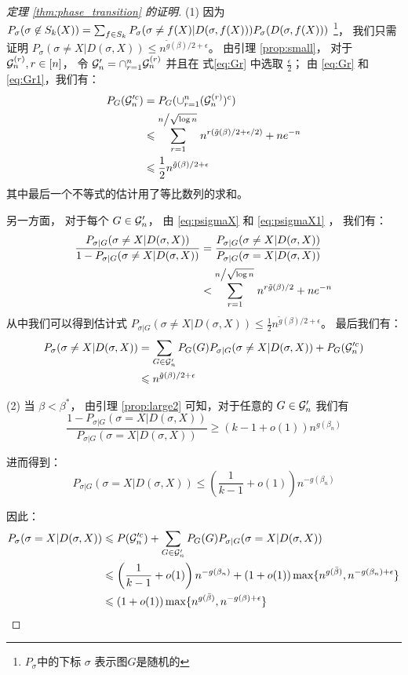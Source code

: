 \begin{proof}[定理 \ref{thm:phase_transition} 的证明]
	(1) 因为 $P_{\sigma}(\sigma \not \in S_k(X)) = \sum_{f\in S_k} P_{\sigma}(\sigma \neq f(X) | D(\sigma, f(X)))
  \linebreak P_{\sigma}(D(\sigma, f(X)))$
  \footnote{$P_{\sigma}$中的下标 $\sigma$ 表示图$G$是随机的}，
	我们只需证明 $P_{\sigma}(\sigma \neq X | D(\sigma, X)) \leq  n^{\tilde{g}(\beta)/2 + \epsilon}$。
	由引理 \ref{prop:small}， 对于 $\mathcal{G}_n^{(r)}, r\in [n]$，
	令 $\mathcal{G}'_n = \cap_{r=1}^n \mathcal{G}_n^{(r)}$ 
  并且在 式\eqref{eq:Gr} 中选取 $\frac{\epsilon}{2}$；
  由 \eqref{eq:Gr} 和 \eqref{eq:Gr1}，我们有：
	\begin{align*}
	P_G(\mathcal{G}'^c_n) &= P_G(\cup_{r=1}^n (\mathcal{G}_n^{(r)})^c) \\
	&\leqslant \sum_{r=1}^{n\left/\sqrt{\log n } \right. } n^{r(\tilde{g}(\beta)/2 + \epsilon/2)}  + n e^{-n} \\
	& \leqslant \frac{1}{2} n^{\tilde{g}(\beta)/2 + \epsilon}
	\end{align*}
	其中最后一个不等式的估计用了等比数列的求和。

	另一方面， 对于每个 $G \in \mathcal{G}'_n$，
  由 \eqref{eq:psigmaX} 和 \eqref{eq:psigmaX1} ，
	我们有：
	\begin{align*}
	\frac{P_{\sigma | G}(\sigma \neq X | D(\sigma, X))}{1-P_{\sigma | G}(\sigma \neq X | D(\sigma, X))} &= \frac{P_{\sigma | G}(\sigma \neq X | D(\sigma, X))}{P_{\sigma|G}(\sigma=X | D(\sigma, X))} \\
	&< \sum_{r=1}^{n \left/\sqrt{\log n } \right.}  n^{r\tilde{g}(\beta)/2} + n e^{-n}
	\end{align*}
	从中我们可以得到估计式 $P_{\sigma | G}(\sigma \neq X | D(\sigma, X))\leq \frac{1}{2}n^{\tilde{g}(\beta)/2 + \epsilon}$。
	最后我们有： 
	\begin{align*}
	P_{\sigma}(\sigma \neq X|D(\sigma, X)) &= \sum_{G\in \mathcal{G}'_n} P_G(G)P_{\sigma |G}(\sigma \neq X | D(\sigma, X)) + P_G(\mathcal{G}'^c_n)\\	
	& \leqslant n^{\tilde{g}(\beta)/2 + \epsilon}
	\end{align*}
	
	(2) 当 $\beta < \beta^*$，
  由引理 \ref{prop:large2} 可知，对于任意的 $G \in \mathcal{G}'_n$
	我们有
	$$
	\frac{1-P_{\sigma | G}(\sigma=X | D(\sigma, X))}{P_{\sigma | G}(\sigma=X | D(\sigma, X))}\geq (k-1+o(1))n^{g(\beta_n)}
	$$
	
	进而得到：
	$$
	P_{\sigma | G}(\sigma=X| D(\sigma, X)) \leq \left(\frac{1}{k-1}+o(1) \right) n^{-g(\beta_n)}
	$$
	
	因此：
	\begin{align*}
	P_{\sigma}(\sigma=X| D(\sigma, X))  &\leqslant  P(\mathcal{G}'^c_n) + \sum_{G\in \mathcal{G}'_n}P_G(G) P_{\sigma|G}(\sigma=X| D(\sigma, X)) \\
	& \leqslant \left(
    \frac{1}{k-1}+o(1) \right)
    n^{-g(\beta_n)} + (1+o(1)) \max\{n^{g(\bar{\beta})}, n^{- g(\beta_n) + \epsilon} \}\\
	& \leqslant (1+o(1)) \max\{n^{g(\bar{\beta})}, n^{-g(\beta) + \epsilon}  \}
	\end{align*}
	

\end{proof}
